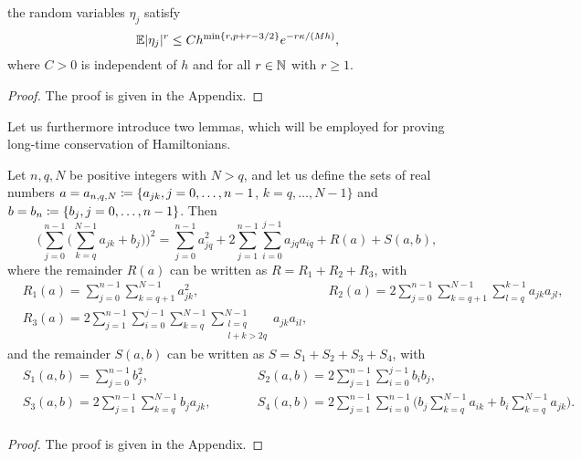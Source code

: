 \documentclass[10pt]{article}
\begin{document}
\begin{lemma}\label{lem:BoundEtaJ}  the random variables $\eta_j$ satisfy
	\begin{equation}
	\operatorname{\mathbb{E}} \lvert\eta_j\rvert^r \leq C h^{\min\{r, p+r-3/2\}} e^{-r\kappa/(Mh)}, 
	\end{equation}
	where $C > 0$ is independent of $h$ and for all $r \in \mathbb{N}$ with $r \geq 1$.
\end{lemma}
\begin{proof} The proof is given in the Appendix. \end{proof}
Let us furthermore introduce two lemmas, which will be employed for proving long-time conservation of Hamiltonians.    
\begin{lemma}\label{lem:Expansion}  Let $n, q, N$ be positive integers with $N > q$, and let us define the sets of real numbers $a = a_{n,q,N} \coloneqq \{a_{jk}, j = 0, \ldots, n-1$, $k = q, \ldots, N-1\}$ and $b = b_n \coloneqq \{b_j, j = 0, \ldots, n-1\}$. Then
	\begin{equation}
	\Big(\sum_{j=0}^{n-1} \Big(\sum_{k=q}^{N-1} a_{jk} + b_j\Big)\Big)^2 = \sum_{j=0}^{n-1} a_{jq}^2 + 2 \sum_{j=1}^{n-1} \sum_{i=0}^{j-1} a_{jq}a_{iq} + R(a) + S(a, b),
	\end{equation}
	where the remainder $R(a)$ can be written as $R = R_1 + R_2 + R_3$, with
	\begin{equation}
	\begin{alignedat}{2}
		&R_1(a) = \sum_{j=0}^{n-1}\sum_{k=q+1}^{N-1} a_{jk}^2,	&&R_2(a) = 2 \sum_{j=0}^{n-1}\sum_{k=q+1}^{N-1}\sum_{l=q}^{k-1} a_{jk} a_{jl},\\
		&R_3(a) = 2 \sum_{j=1}^{n-1} \sum_{i=0}^{j-1} \sum_{k=q}^{N-1}\sum_{\substack{l=q \\ l+k > 2q}}^{N-1} a_{jk}a_{il},
	\end{alignedat}
	\end{equation}
	and the remainder $S(a, b)$ can be written as $S = S_1 + S_2 + S_3 + S_4$, with
	\begin{equation}
	\begin{alignedat}{2}
		&S_1(a, b) = \sum_{j=0}^{n-1} b_j^2,  &&S_2(a, b) = 2\sum_{j=1}^{n-1} \sum_{i=0}^{j-1} b_i b_j, \\
		&S_3(a, b) = 2\sum_{j=1}^{n-1} \sum_{k=q}^{N-1} b_j a_{jk}, \qquad &&S_4(a, b) = 2\sum_{j=1}^{n-1}\sum_{i=0}^{n-1}\Big(b_j \sum_{k=q}^{N-1} a_{ik} + b_i \sum_{k=q}^{N-1} a_{jk}\Big).\\
	\end{alignedat}
	\end{equation}
\end{lemma}
\begin{proof} The proof is given in the Appendix. \end{proof}
\end{document}
